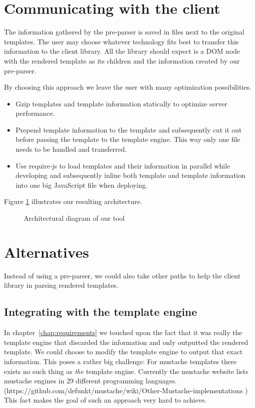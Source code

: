 \documentclass[thesis.tex]{subfiles}
\begin{document}
\section{Communicating with the client}

The information gathered by the pre-parser is saved in files next to the
original templates. The user may choose whatever technology fits best to
transfer this information to the client library. All the library should expect
is a DOM node with the rendered template as its children and the information
created by our pre-parser.

By choosing this approach we leave the user with many optimization
possibilities.
\begin{itemize}
\item Gzip templates and template information statically to optimize
      server performance.
\item Prepend template information to the template and subsequently
      cut it out before passing the template to the template engine.
      This way only one file needs to be handled and transferred.
\item Use require-js to load templates and their information in parallel
      while developing and subsequently inline both template and
      template information into one big JavaScript file when deploying.
\end{itemize}

Figure \ref{fig:architecture} illustrates our resulting architecture.

\begin{figure}
	\centering
	\resizebox{\linewidth}{!}{}
	\caption{Architectural diagram of our tool}
	\label{fig:architecture}
\end{figure}

\section{Alternatives}

Instead of using a pre-parser, we could also take other paths to help
the client library in parsing rendered templates.

\subsection{Integrating with the template engine}

In chapter~\ref{chap:requirements} we touched upon the fact that it was really
the template engine that discarded the information and only outputted the
rendered template. We could choose to modify the template engine to output that
exact information. This poses a rather big challenge:
For mustache templates there exists no such thing as \emph{the} template engine.
Currently the mustache website lists mustache engines in 29 different
programming languages. (https://github.com/defunkt/mustache/wiki/Other-Mustache-implementations )
This fact makes the goal of such an approach very hard to achieve.
\end{document}
